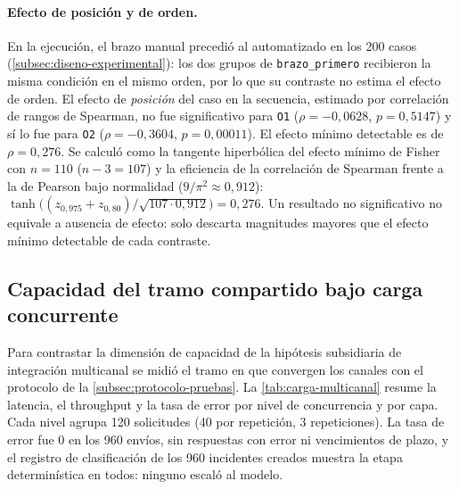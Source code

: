 \paragraph{Efecto de posición y de orden.} En la ejecución, el brazo manual precedió al automatizado en los 200 casos (\autoref{subsec:diseno-experimental}): los dos grupos de \texttt{brazo\_primero} recibieron la misma condición en el mismo orden, por lo que su contraste no estima el efecto de orden. El efecto de \emph{posición} del caso en la secuencia, estimado por correlación de rangos de Spearman, no fue significativo para \texttt{O1} ($\rho = -0,0628$, $p = 0,5147$) y sí lo fue para \texttt{O2} ($\rho = -0,3604$, $p = 0,00011$). El efecto mínimo detectable es de $\rho = 0,276$. Se calculó como la tangente hiperbólica del efecto mínimo de Fisher con $n = 110$ ($n - 3 = 107$) y la eficiencia de la correlación de Spearman frente a la de Pearson bajo normalidad ($9/\pi^2 \approx 0{,}912$): $\tanh\big((z_{0{,}975} + z_{0{,}80})/\sqrt{107 \cdot 0{,}912}\big) = 0{,}276$. Un resultado no significativo no equivale a ausencia de efecto: solo descarta magnitudes mayores que el efecto mínimo detectable de cada contraste.

\subsection{Capacidad del tramo compartido bajo carga concurrente}\label{subsec:carga-concurrente}

Para contrastar la dimensión de capacidad de la hipótesis subsidiaria de integración multicanal se midió el tramo en que convergen los canales con el protocolo de la \autoref{subsec:protocolo-pruebas}. La \autoref{tab:carga-multicanal} resume la latencia, el throughput y la tasa de error por nivel de concurrencia y por capa. Cada nivel agrupa 120 solicitudes (40 por repetición, 3 repeticiones). La tasa de error fue 0 en los 960 envíos, sin respuestas con error ni vencimientos de plazo, y el registro de clasificación de los 960 incidentes creados muestra la etapa determinística en todos: ninguno escaló al modelo.

